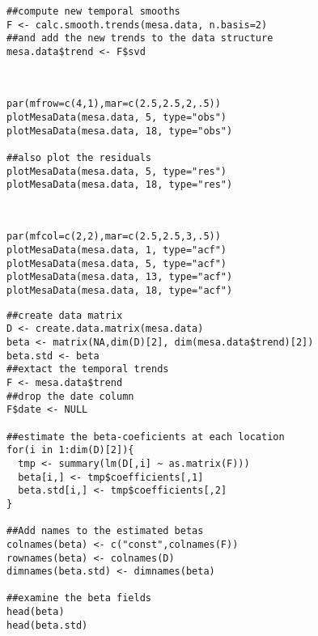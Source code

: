 \begin{verbatim}
##compute new temporal smooths
F <- calc.smooth.trends(mesa.data, n.basis=2)
##and add the new trends to the data structure
mesa.data$trend <- F$svd
\end{verbatim}
 \\
%
\vspace*{-1\baselineskip}
\begin{verbatim}
par(mfrow=c(4,1),mar=c(2.5,2.5,2,.5))
plotMesaData(mesa.data, 5, type="obs")
plotMesaData(mesa.data, 18, type="obs")

##also plot the residuals
plotMesaData(mesa.data, 5, type="res")
plotMesaData(mesa.data, 18, type="res")
\end{verbatim}
\\
%
\vspace*{-1\baselineskip}
\begin{verbatim}
par(mfcol=c(2,2),mar=c(2.5,2.5,3,.5))
plotMesaData(mesa.data, 1, type="acf")
plotMesaData(mesa.data, 5, type="acf")
plotMesaData(mesa.data, 13, type="acf")
plotMesaData(mesa.data, 18, type="acf")
\end{verbatim}
\begin{verbatim}
##create data matrix
D <- create.data.matrix(mesa.data)
beta <- matrix(NA,dim(D)[2], dim(mesa.data$trend)[2])
beta.std <- beta
##extact the temporal trends
F <- mesa.data$trend
##drop the date column
F$date <- NULL

##estimate the beta-coeficients at each location
for(i in 1:dim(D)[2]){
  tmp <- summary(lm(D[,i] ~ as.matrix(F)))
  beta[i,] <- tmp$coefficients[,1]
  beta.std[i,] <- tmp$coefficients[,2]
}

##Add names to the estimated betas
colnames(beta) <- c("const",colnames(F))
rownames(beta) <- colnames(D)
dimnames(beta.std) <- dimnames(beta)

##examine the beta fields
head(beta)
head(beta.std)
\end{verbatim}
